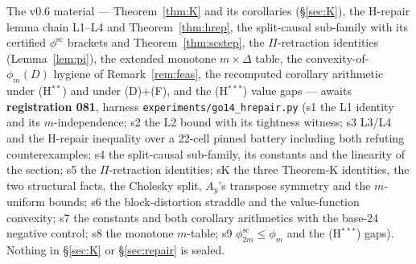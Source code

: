 \documentclass[11pt]{article}
\theoremstyle{definition}
\theoremstyle{remark}
\begin{document}
The v0.6 material --- Theorem~\ref{thm:K} and its corollaries
(\S\ref{sec:K}), the H-repair lemma chain
L1--L4 and Theorem~\ref{thm:hrep}, the split-causal sub-family with
its certified $\phi^{\mathrm{sc}}$ brackets and
Theorem~\ref{thm:scstep}, the $\Pi$-retraction identities
(Lemma~\ref{lem:pi}), the extended monotone $m\times\Delta$ table, the
convexity-of-$\phi_m(D)$ hygiene of Remark~\ref{rem:feas}, the
recomputed corollary arithmetic under (H$^{\ast\ast}$) and under
(D)$+$(F), and the (H$^{\ast\ast\ast}$) value gaps --- awaits
\textbf{registration 081}, harness
\texttt{experiments/go14\_hrepair.py} (s1 the L1 identity and its
$m$-independence; s2 the L2 bound with its tightness witness; s3
L3/L4 and the H-repair inequality over a 22-cell pinned battery
including both refuting counterexamples; s4 the split-causal
sub-family, its constants and the linearity of the section; s5 the
$\Pi$-retraction identities; sK the three Theorem-K identities, the
two structural facts, the Cholesky split, $A_y$'s transpose symmetry
and the $m$-uniform bounds; s6 the block-distortion straddle and the
value-function convexity; s7 the constants and both corollary
arithmetics with the base-24 negative control; s8 the monotone
$m$-table; s9 $\phi^{\mathrm{sc}}_{2m}\le\phi_m$ and the
(H$^{\ast\ast\ast}$) gaps). Nothing in \S\ref{sec:K} or
\S\ref{sec:repair} is sealed.
\end{document}
